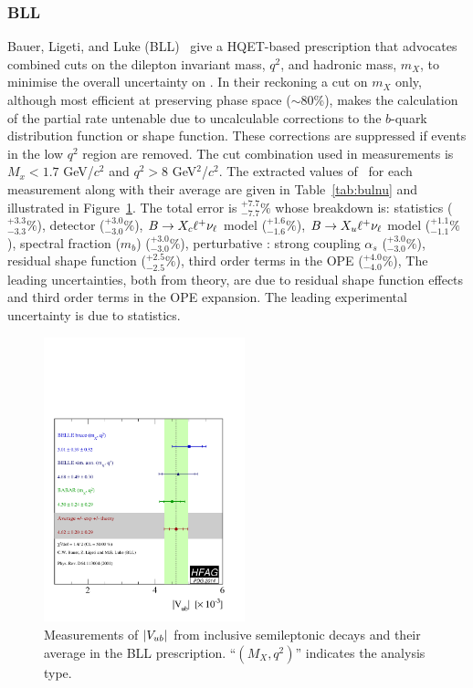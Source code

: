 \subsubsection{BLL}
Bauer, Ligeti, and Luke (BLL)~\cite{ref:BLL} give a
HQET-based prescription that advocates combined cuts on the dilepton invariant mass, $q^2$,
and hadronic mass, $m_X$, to minimise the overall uncertainty on \vub.
In their reckoning a cut on $m_X$ only, although most efficient at
preserving phase space ($\sim$80\%), makes the calculation of the partial
rate untenable due to uncalculable corrections
to the $b$-quark distribution function or shape function. These corrections are
suppressed if events in the low $q^2$ region are removed. The cut combination used
in measurements is $M_x<1.7$ GeV/$c^2$ and $q^2 > 8$ GeV$^2$/$c^2$.  
The extracted values
of \vub\, for each measurement along with their average are given in
Table~\ref{tab:bulnu} and illustrated in Figure~\ref{fig:BLL}.
The total error is $^{+7.7}_{-7.7}\%$ whose breakdown is:
statistics ($^{+3.3}_{-3.3}\%$),
detector ($^{+3.0}_{-3.0}\%$),
$B\to X_c \ell^+ \nu_\ell$ model ($^{+1.6}_{-1.6}\%$),
$B\to X_u \ell^+ \nu_\ell$ model ($^{+1.1}_{-1.1}\%$),
spectral fraction ($m_b$) ($^{+3.0}_{-3.0}\%$),
perturbative : strong coupling $\alpha_s$ ($^{+3.0}_{-3.0}\%$),
residual shape function ($^{+2.5}_{-2.5}\%$),
third order terms in the OPE ($^{+4.0}_{-4.0}\%$),
The leading
uncertainties, both from theory, are due to residual shape function
effects and third order terms in the OPE expansion. The leading
experimental uncertainty is due to statistics. 

\begin{figure}
\begin{center}
\includegraphics[width=0.52\textwidth]{figures/slb/vub_mxq2_allMoments.pdf}
\end{center}
\caption{Measurements of $|V_{ub}|$ from inclusive semileptonic decays 
and their average in the BLL prescription.
``$(M_X, q^2)$'' indicates the analysis type.}
\label{fig:BLL}
\end{figure}


